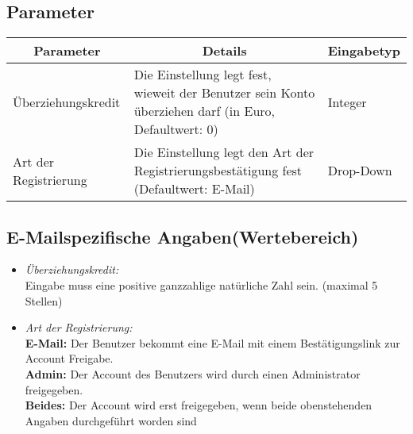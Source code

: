 \subsection{Parameter}
\begin{center}
	\begin{longtable}{|p{4cm} | p{7cm} | p{2cm} |}
		\hline
		\multicolumn{1}{|c|}{\textbf{Parameter}} & \multicolumn{1}{c|}{\textbf{Details}} & \multicolumn{1}{c|}{\textbf{Eingabetyp}}
		\\ \hline
		Überziehungskredit & Die Einstellung legt fest, wieweit der Benutzer sein Konto überziehen darf (in Euro, Defaultwert: 0) & Integer \\ \hline
		Art der Registrierung & Die Einstellung legt den Art der Registrierungsbestätigung fest (Defaultwert: E-Mail) & Drop-Down \\ \hline
		
		
	\end{longtable}
\end{center}
\subsection{E-Mailspezifische Angaben(Wertebereich)}

\begin{itemize}
	\item \emph{Überziehungskredit:}\\
	Eingabe muss eine positive ganzzahlige natürliche Zahl sein. (maximal 5 Stellen)
	\item \emph{Art der Registrierung:}\\
	\textbf{E-Mail:} Der Benutzer bekommt eine E-Mail mit einem Bestätigungslink zur Account Freigabe.\\
	\textbf{Admin:} Der Account des Benutzers wird durch einen Administrator freigegeben.\\
	\textbf{Beides:} Der Account wird erst freigegeben, wenn beide obenstehenden Angaben durchgeführt worden sind
\end{itemize}



